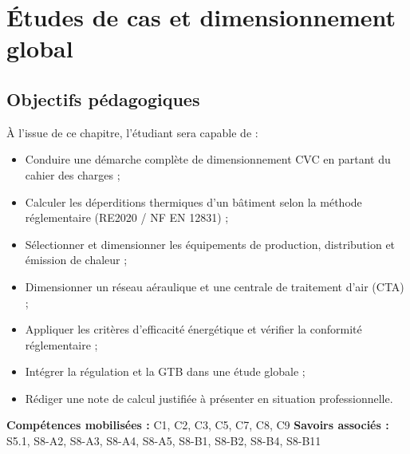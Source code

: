 \chapter{Études de cas et dimensionnement global}

\section{Objectifs pédagogiques}

À l'issue de ce chapitre, l'étudiant sera capable de :
\begin{itemize}
  \item Conduire une démarche complète de dimensionnement CVC en partant du cahier des charges ;
  \item Calculer les déperditions thermiques d'un bâtiment selon la méthode réglementaire (RE2020 / NF EN 12831) ;
  \item Sélectionner et dimensionner les équipements de production, distribution et émission de chaleur ;
  \item Dimensionner un réseau aéraulique et une centrale de traitement d'air (CTA) ;
  \item Appliquer les critères d'efficacité énergétique et vérifier la conformité réglementaire ;
  \item Intégrer la régulation et la GTB dans une étude globale ;
  \item Rédiger une note de calcul justifiée à présenter en situation professionnelle.
\end{itemize}

\textbf{Compétences mobilisées :} C1, C2, C3, C5, C7, C8, C9 \quad
\textbf{Savoirs associés :} S5.1, S8-A2, S8-A3, S8-A4, S8-A5, S8-B1, S8-B2, S8-B4, S8-B11

